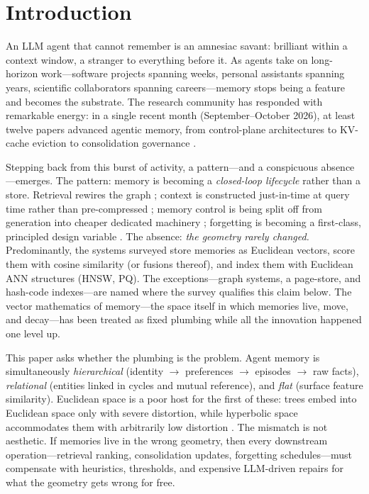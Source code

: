 \documentclass[11pt,a4paper]{article}
\begin{document}
\section{Introduction}

An LLM agent that cannot remember is an amnesiac savant: brilliant within a
context window, a stranger to everything before it. As agents take on
long-horizon work---software projects spanning weeks, personal assistants
spanning years, scientific collaborators spanning careers---memory stops
being a feature and becomes the substrate. The research community has
responded with remarkable energy: in a single recent month (September--October
2026), at least twelve papers advanced agentic memory, from control-plane
architectures to KV-cache eviction to consolidation governance
\cite{jevmem,jam,realm,actkv,epistemics,mhr,engramrag,biomem,mrvq,agentkv,collabmem,simplearm}.

Stepping back from this burst of activity, a pattern---and a conspicuous
absence---emerges. The pattern: memory is becoming a \emph{closed-loop
lifecycle} rather than a store. Retrieval rewires the graph
\cite{realm,engramrag}; context is constructed just-in-time at query time
rather than pre-compressed \cite{jam}; memory control is being split off
from generation into cheaper dedicated machinery \cite{jevmem}; forgetting
is becoming a first-class, principled design variable \cite{engramrag,
epistemics}. The absence: \emph{the geometry rarely changed.} Predominantly,
the systems surveyed store memories as Euclidean vectors, score them
with cosine similarity (or fusions thereof), and index them with
Euclidean ANN structures (HNSW, PQ). The exceptions---graph systems, a
page-store, and hash-code indexes---are named where the survey qualifies
this claim below. The vector mathematics of memory---the space itself
in which memories live, move, and decay---has been treated as fixed
plumbing while all the innovation happened one level up.

This paper asks whether the plumbing is the problem. Agent memory is
simultaneously \emph{hierarchical} (identity $\to$ preferences $\to$
episodes $\to$ raw facts), \emph{relational} (entities linked in cycles and
mutual reference), and \emph{flat} (surface feature similarity). Euclidean
space is a poor host for the first of these: trees embed into Euclidean
space only with severe distortion, while hyperbolic space accommodates them
with arbitrarily low distortion \cite{nickel2017}. The mismatch is not
aesthetic. If memories live in the wrong geometry, then every downstream
operation---retrieval ranking, consolidation updates, forgetting
schedules---must compensate with heuristics, thresholds, and expensive
LLM-driven repairs for what the geometry gets wrong for free.
\end{document}
